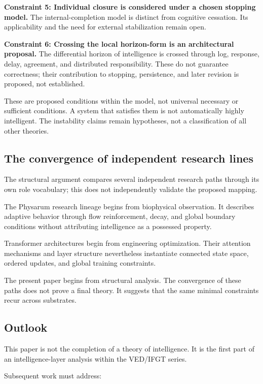 \textbf{Constraint 5: Individual closure is considered under a chosen stopping model.}
The internal-completion model is distinct from cognitive cessation. Its applicability and the need for external stabilization remain open.

\textbf{Constraint 6: Crossing the local horizon-form is an architectural proposal.}
The differential horizon of intelligence is crossed through log, response, delay, agreement, and distributed responsibility. These do not guarantee correctness; their contribution to stopping, persistence, and later revision is proposed, not established.

These are proposed conditions within the model, not universal necessary or sufficient conditions. A system that satisfies them is not automatically highly intelligent. The instability claims remain hypotheses, not a classification of all other theories.

\subsection{The convergence of independent research lines}

The structural argument compares several independent research paths through its own role vocabulary; this does not independently validate the proposed mapping.

The Physarum research lineage begins from biophysical observation. It describes adaptive behavior through flow reinforcement, decay, and global boundary conditions without attributing intelligence as a possessed property.

Transformer architectures begin from engineering optimization. Their attention mechanisms and layer structure nevertheless instantiate connected state space, ordered updates, and global training constraints.

The present paper begins from structural analysis. The convergence of these paths does not prove a final theory. It suggests that the same minimal constraints recur across substrates.

\subsection{Outlook}

This paper is not the completion of a theory of intelligence. It is the first part of an intelligence-layer analysis within the VED/IFGT series.

Subsequent work must address:


